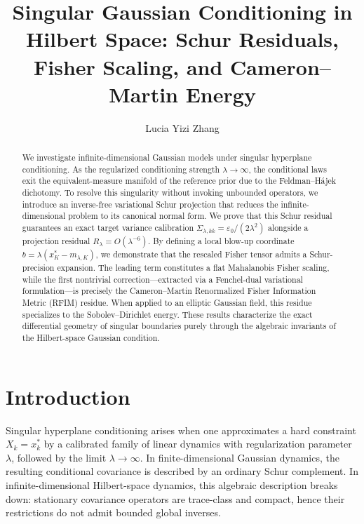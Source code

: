 \documentclass[11pt]{amsart}
\title[Singular Gaussian Conditioning in Hilbert Space]{Singular Gaussian Conditioning in Hilbert Space: Schur Residuals, Fisher Scaling, and Cameron--Martin Energy}
\author{Lucia Yizi Zhang}
\theoremstyle{plain}
\theoremstyle{definition}
\theoremstyle{remark}
\begin{document}
    \begin{abstract}
        We investigate infinite-dimensional Gaussian models under singular hyperplane conditioning. As the regularized conditioning strength $\lambda \to \infty$, the conditional laws exit the equivalent-measure manifold of the reference prior due to the Feldman–H\'{a}jek dichotomy. To resolve this singularity without invoking unbounded operators, we introduce an inverse-free variational Schur projection that reduces the infinite-dimensional problem to its canonical normal form. We prove that this Schur residual guarantees an exact target variance calibration $\Sigma_{\lambda,kk} = \varepsilon_0/(2\lambda^2)$ alongside a projection residual $R_\lambda = O(\lambda^{-6})$. By defining a local blow-up coordinate $b = \lambda(x_K^* - m_{\lambda,K})$, we demonstrate that the rescaled Fisher tensor admits a Schur-precision expansion. The leading term constitutes a flat Mahalanobis Fisher scaling, while the first nontrivial correction—extracted via a Fenchel-dual variational formulation—is precisely the Cameron–Martin Renormalized Fisher Information Metric (RFIM) residue. When applied to an elliptic Gaussian field, this residue specializes to the Sobolev–Dirichlet energy. These results characterize the exact differential geometry of singular boundaries purely through the algebraic invariants of the Hilbert-space Gaussian condition.
    \end{abstract}


    \maketitle

    \section{Introduction}
    \label{sec:intro}

    Singular hyperplane conditioning arises when one approximates a hard constraint $X_k = x_k^*$ by a calibrated family of linear dynamics with regularization parameter $\lambda$, followed by the limit $\lambda \to \infty$. In finite-dimensional Gaussian dynamics, the resulting conditional covariance is described by an ordinary Schur complement. In infinite-dimensional Hilbert-space dynamics, this algebraic description breaks down: stationary covariance operators are trace-class and compact, hence their restrictions do not admit bounded global inverses.
\end{document}
